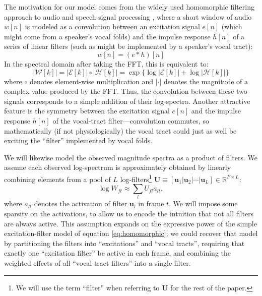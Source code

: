 \documentclass{article} %
\begin{document}
The motivation for our model comes from the widely used homomorphic
filtering approach to audio and speech signal processing
\cite{oppenheim1968homomorphic}, where a short window of audio $w[n]$
is modeled as a convolution between an excitation signal $e[n]$ (which
might come from a speaker's vocal folds) and the impulse response
$h[n]$ of a series of linear filters (such as might be implemented by
a speaker's vocal tract):
\begin{equation}
\label{eq:homomorphic}
w[n] = (e \ast h)[n]
\end{equation}
In the spectral domain after taking the FFT,
this is equivalent to:
\begin{equation}\label{eq:convolve}
|\mathcal{W}[k]| = |\mathcal{E}[k]| \circ |\mathcal{H}[k]| 
= \exp\{\log |\mathcal{E}[k]| + \log |\mathcal{H}[k]|\}
\end{equation}
where $\circ$ denotes element-wise multiplication and $|\cdot|$
denotes the magnitude of a complex value produced by the FFT. Thus,
the convolution between these two signals corresponds to a simple addition of
their log-spectra. Another attractive feature is the symmetry between
the excitation signal $e[n]$ and the impulse response $h[n]$ of the
vocal-tract filter---convolution commutes, so mathematically (if not
physiologically) the vocal tract could just as well be exciting the
``filter'' implemented by vocal folds.

We will likewise model the observed magnitude spectra as a
product of filters. We assume each observed log-spectrum is approximately obtained
by linearly combining elements from a pool of $L$ log-filters\footnote{We will use the
  term ``filter'' when referring to $\mathbf{U}$ for the rest of the paper.}
$ \mathbf{U} \equiv [\bm{u}_1| \bm{u}_2 | \cdots | \bm{u}_L]  \in \mathbb{R}^{F\times L}$:
\begin{equation}
\log W_{ft} \approx \textstyle{\sum_l} U_{fl}a_{lt},
\end{equation}
where $a_{lt}$ denotes the activation of filter $\bm{u}_l$ in frame
$t$. We will impose some sparsity on the activations, to allow us to
encode the intuition that not all filters are always active.  This
assumption expands on the expressive power of the simple
excitation-filter model of equation \ref{eq:homomorphic}; we could
recover that model by partitioning the filters into ``excitations''
and ``vocal tracts'', requiring that exactly one ``excitation filter''
be active in each frame, and combining the weighted effects of all
``vocal tract filters'' into a single filter.
\end{document}
